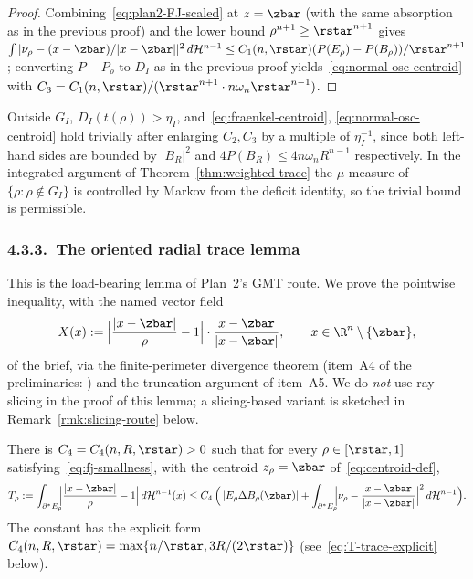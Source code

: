 \begin{proof}
Combining~\eqref{eq:plan2-FJ-scaled} at $z=\zbar$ (with the same absorption as
in the previous proof) and the lower bound $\rho^{n+1}\ge\rstar^{n+1}$
gives
$\int|\nu_\rho-(x-\zbar)/|x-\zbar||^2\,d\mathcal H^{n-1}\le
C_1(n,\rstar)(P(E_\rho)-P(B_\rho))/\rstar^{n+1}$; converting $P-P_\rho$ to
$D_I$ as in the previous proof yields~\eqref{eq:normal-osc-centroid}
with $C_3=C_1(n,\rstar)/(\rstar^{n+1}\cdot n\omega_n\rstar^{n-1})$.
\end{proof}

\begin{remark}
Outside $G_I$, $D_I(t(\rho))>\eta_I$, and~\eqref{eq:fraenkel-centroid},
\eqref{eq:normal-osc-centroid} hold trivially after enlarging
$C_2,C_3$ by a multiple of $\eta_I^{-1}$, since both left-hand sides are
bounded by $|B_R|^2$ and $4P(B_R)\le 4n\omega_n R^{n-1}$ respectively.
In the integrated argument of Theorem~\ref{thm:weighted-trace} the
$\mu$-measure of $\{\rho:\rho\notin G_I\}$ is controlled by Markov from
the deficit identity, so the trivial bound is permissible.
\end{remark}

\subsubsection{4.3.3.\ The oriented radial trace lemma}
\label{ssec:radial-trace}

This is the load-bearing lemma of Plan~2's GMT route. We prove the
pointwise inequality, with the named vector field
\begin{equation}\label{eq:X-def}
   X(x)
   :=\Bigl|\frac{|x-\zbar|}{\rho}-1\Bigr|\cdot\frac{x-\zbar}{|x-\zbar|},
   \qquad x\in\R^n\setminus\{\zbar\},
\end{equation}
of the brief, via the finite-perimeter divergence theorem (item~A4 of
the preliminaries: \cite[Thm.\ 16.3]{Maggi2012}) and the truncation
argument of item~A5. We do \emph{not} use ray-slicing in the proof of
this lemma; a slicing-based variant is sketched in
Remark~\ref{rmk:slicing-route} below.

\begin{theorem}
\label{thm:radial-trace}\label{thm:fj-radial-divergence}\label{lem:radial-trace-master}
There is $C_4=C_4(n,R,\rstar)>0$ such that for every
$\rho\in[\rstar,1]$ satisfying~\eqref{eq:fj-smallness}, with the centroid
$z_\rho=\zbar$ of~\eqref{eq:centroid-def},
\begin{equation}\label{eq:radial-trace}
   T_\rho
   :=\int_{\partial^*E_\rho}\!\!\Bigl|\frac{|x-\zbar|}{\rho}-1\Bigr|\,
       d\mathcal H^{n-1}(x)
   \le
   C_4\,\Bigl(\,|E_\rho\Delta B_\rho(\zbar)|
   +\int_{\partial^*E_\rho}\!\!\Bigl|\nu_\rho-\frac{x-\zbar}{|x-\zbar|}\Bigr|^2\,
       d\mathcal H^{n-1}\Bigr).
\end{equation}
The constant has the explicit form $C_4(n,R,\rstar)=\max\{n/\rstar,3R/(2\rstar)\}$
(see~\eqref{eq:T-trace-explicit} below).
\end{theorem}

